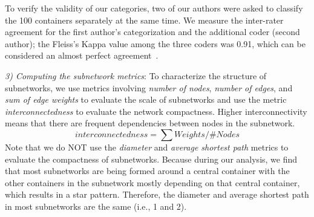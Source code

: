 \documentclass[sigconf]{acmart}
\begin{document}
To verify the validity of our categories, two of our authors were asked to classify the 100 containers separately at the same time. 
We measure the inter-rater agreement for the first author's categorization and the additional coder (second author); the Fleiss's Kappa value among the three coders was 0.91, which can be considered an almost perfect agreement~\cite{landis1977measurement}.

 

 
\noindent\emph{3) Computing the subnetwork metrics}: 
To characterize the structure of subnetworks, we use metrics involving \emph{number of nodes}, \emph{number of edges}, and \emph{sum of edge weights} to evaluate the scale of subnetworks and use the metric \emph{interconnectedness} to evaluate the network compactness. Higher interconnectivity means that there are frequent dependencies between nodes in the subnetwork.
\begin{equation}
interconnectedness = \sum Weights/\#Nodes\label{eq}
\end{equation}
Note that we do NOT use the \emph{diameter} and \emph{average shortest path} metrics to evaluate the compactness of subnetworks. 
Because during our analysis, we find that 
most subnetworks are being formed around a central container with the other containers in the subnetwork mostly depending on that central container, which results in a star pattern. 
Therefore, the diameter and average shortest path in most subnetworks are the same (i.e., 1 and 2). 


\end{document}
